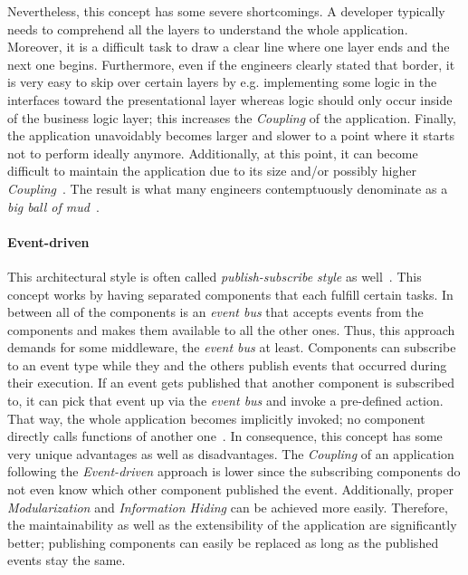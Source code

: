 \documentclass[12pt,a4paper,twoside]{report}
\begin{document}
Nevertheless, this concept has some severe shortcomings.
A developer typically needs to comprehend all the layers to understand the whole application.
Moreover, it is a difficult task to draw a clear line where one layer ends and the
next one begins.
Furthermore, even if the engineers clearly stated that border,
it is very easy to skip over certain layers by e.g. implementing some logic
in the interfaces toward the presentational layer whereas logic should only occur
inside of the business logic layer; this increases the \textit{Coupling} of the application.
Finally, the application unavoidably becomes larger and slower to a point
where it starts not to perform ideally anymore.
Additionally, at this point, it can become difficult to maintain the application due
to its size and/or possibly higher \textit{Coupling}~\cite{richards-sa-patterns}.
The result is what many engineers contemptuously denominate
as a \textit{big ball of mud}~\cite{fairbanks-sa}.

\paragraph{Event-driven}
This architectural style is often called \textit{publish-subscribe style} as well~\cite{fairbanks-sa}.
This concept works by having separated components that each fulfill certain tasks.
In between all of the components is an \textit{event bus} that accepts events from
the components and makes them available to all the other ones. Thus, this approach
demands for some middleware, the \textit{event bus} at least.
Components can subscribe to an event type while they and the others publish events
that occurred during their execution. If an event gets published that another component
is subscribed to, it can pick that event up via the \textit{event bus} and invoke
a pre-defined action. That way, the whole application becomes implicitly invoked;
no component directly calls functions of another one~\cite{garlan-shaw-sa}.
In consequence, this concept has some very unique advantages as well as disadvantages.
The \textit{Coupling} of an application following the \textit{Event-driven} approach
is lower since the subscribing components do not even know which other component
published the event. Additionally, proper \textit{Modularization} and \textit{Information Hiding}
can be achieved more easily. Therefore, the maintainability as well as the extensibility
of the application are significantly better; publishing components can easily be replaced
as long as the published events stay the same.
\end{document}
